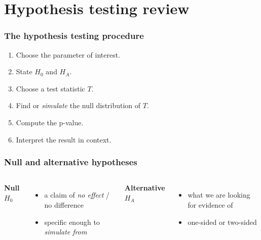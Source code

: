 \documentclass[slidestop,compress,mathserif]{beamer}
\begin{document}
\section{Hypothesis testing review}
\begin{frame}
\frametitle{The hypothesis testing procedure}

\begin{enumerate}
\item Choose the parameter of interest.
\item State $H_0$ and $H_A$.
\item Choose a test statistic $T$.
\item Find or \emph{simulate} the null distribution of $T$.
\item Compute the p-value.
\item Interpret the result in context.
\end{enumerate}

\vspace{0.5em}

\end{frame}
\begin{frame}
\frametitle{Null and alternative hypotheses}

\begin{columns}[T]
\textbf{Null $H_0$}
\begin{itemize}
\item a claim of \emph{no effect} / no difference
\item specific enough to \emph{simulate from}
\end{itemize}

\textbf{Alternative $H_A$}
\begin{itemize}
\item what we are looking for evidence of
\item one-sided or two-sided
\end{itemize}
\end{columns}


\pause
{}

\end{frame}
\end{document}

